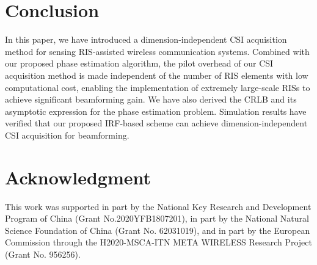 \documentclass[conference,10pt,twocolumn]{IEEEtran}
\theoremstyle{nonumberplain}
\begin{document}
\section{Conclusion}
\label{Conclusion}
    In this paper, we have introduced a dimension-independent CSI acquisition method for sensing RIS-assisted wireless communication systems. 
    Combined with our proposed phase estimation algorithm, the pilot overhead of our CSI acquisition method is made independent of the number of RIS elements with low computational cost, enabling the implementation of extremely large-scale RISs to achieve significant beamforming gain. 
    We have also derived the CRLB and its asymptotic expression for the phase estimation problem.
    Simulation results have verified that our proposed IRF-based scheme can achieve dimension-independent CSI acquisition for beamforming.

\appendices

\section*{Acknowledgment}
    This work was supported in part by the National Key Research and Development Program of China (Grant No.2020YFB1807201), in part by the National Natural Science Foundation of China (Grant No. 62031019), and in part by the European Commission through the H2020-MSCA-ITN META WIRELESS Research Project (Grant No. 956256).

\footnotesize
\balance 


\end{document}
